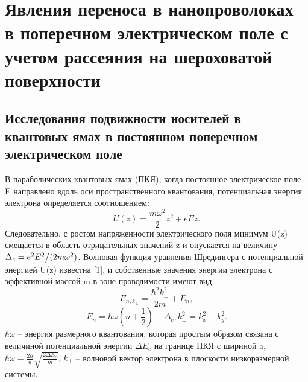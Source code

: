\chapter{Явления переноса в нанопроволоках в поперечном электрическом поле с учетом рассеяния на шероховатой поверхности} \label{chapt4}

\section{Исследования подвижности носителей в квантовых ямах в постоянном поперечном электрическом поле} \label{sect4_1}

В параболических квантовых ямах (ПКЯ), когда постоянное электрическое поле E направлено вдоль оси пространственного квантования, потенциальная энергия электрона определяется соотношением:
\[
U(z)=\frac{m\omega ^{2} }{2} z^{2} +eEz.
\] 
Следовательно, с ростом напряженности электрического поля минимум U(z) смещается в область отрицательных значений z и опускается на величину $\Delta _{c} ={e^{2} E^{2}  \mathord{\left/{\vphantom{e^{2} E^{2}  (2m\omega ^{2} }}\right.\kern-\nulldelimiterspace} (2m\omega ^{2} } )$. Волновая функция уравнения Шредингера с потенциальной энергией U(z) известна [1], и собственные значения энергии электрона с эффективной массой m в зоне проводимости имеют вид:
\begin{equation} \label{eq:41_10}
E_{n,k_{\bot } } =\frac{\hbar ^{2} k_{\bot } ^{2} }{2m} +E_{n},
\end{equation}
\[
E_{n} =\hbar \omega \left(n+\frac{1}{2} \right)-\Delta _{c} , k_{\bot }^{2} =k_{x}^{2} +k_{y}^{2}.
\] 
$\hbar \omega $ -- энергия размерного квантования, которая простым образом связана с величиной потенциальной энергии $\Delta E_{c} $ на границе ПКЯ с шириной a, $\hbar \omega =\frac{2\hbar }{a} \sqrt{\frac{2\Delta E_{c} }{m} } $, $k_{\bot } $ -- волновой вектор электрона в плоскости низкоразмерной системы.

